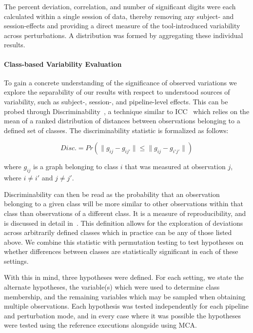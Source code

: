 \documentclass[fleqn,10pt]{SelfArx} %
\begin{document}
The percent deviation, correlation, and number of significant digits were each calculated within a single session of
data, thereby removing any subject- and session-effects and providing a direct measure of the tool-introduced
variability across perturbations. A distribution was formed by aggregating these individual results.

\paragraph{Class-based Variability Evaluation} To gain a concrete understanding of the significance of observed
variations we explore the separability of our results with respect to understood sources of variability, such as 
subject-, session-, and pipeline-level effects. This can be probed through Discriminability~\cite{bridgeford2020elim},
a technique similar to ICC~\cite{Bartko1966-tl} which relies on the mean of a ranked distribution of distances between
observations belonging to a defined set of classes. The discriminability statistic is formalized as follows:

\begin{equation}
Disc. = Pr(\lVert g_{ij} - g_{ij'} \rVert \leq \lVert g_{ij} - g_{i'j'} \rVert)
\label{eq:sigdig}
\end{equation}

where $g_{ij}$ is a graph belonging to class $i$ that was measured at observation $j$, where $i \neq i'$ and
$j \neq j'$.

Discriminability can then be read as the probability that an observation belonging to a given class will be more
similar to other observations within that class than observations of a different class. It is a measure of
reproducibility, and is discussed in detail in~\cite{bridgeford2020elim}. This definition allows for the exploration of
deviations across arbitrarily defined classes which in practice can be any of those listed above. We combine this
statistic with permutation testing to test hypotheses on whether differences between classes are statistically
significant in each of these settings.

With this in mind, three hypotheses were defined. For each setting, we state the alternate hypotheses, the variable(s)
which were used to determine class membership, and the remaining variables which may be sampled when obtaining multiple
observations. Each hypothesis was tested independently for each pipeline and perturbation mode, and in every case where
it was possible the hypotheses were tested using the reference executions alongside using MCA.
\end{document}
